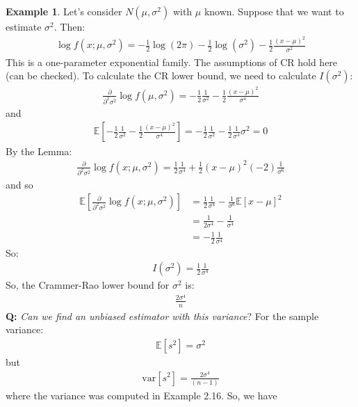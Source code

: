 \documentclass[11pt]{scrartcl}
\theoremstyle{definition}
\newtheorem{ex}{Example}
\theoremstyle{remark}
\newcommand{\EX}[1]{\mathbb{E}\left[#1 \right]}
\begin{document}
{\begin{ex} 
	Let's consider $N(\mu, \sigma^2)$ with $\mu$ known. Suppose that we want to estimate $\sigma^2$. Then: 
	\begin{align*}
		\log f(x; \mu, \sigma^2) = - \frac{1}{2}	 \log (2 \pi) - \frac{1}{2} \log (\sigma^2) - \frac{1}{2} \frac{(x-\mu)^2}{\sigma^2}
	\end{align*}
	This is a one-parameter exponential family. The assumptions of CR hold here (can be checked). To calculate the CR lower bound, we need to calculate $I(\sigma^2)$: 
	\begin{align*}
			\frac{\partial}{\partial^2 \sigma^2} \log f(\mu, \sigma^2) = - \frac{1}{2} \frac{1}{\sigma^2} - \frac{1}{2} \frac{(x-\mu)^2}{\sigma^4}
	\end{align*}
	and
	\begin{align*}
		\EX{- \frac{1}{2} \frac{1}{\sigma^2} - \frac{1}{2} \frac{(x-\mu)^2}{\sigma^4}} = -\frac{1}{2} \frac{1}{\sigma^2} - \frac{1}{2} \frac{1}{\sigma^4} \sigma^2 = 0 
	\end{align*}
	By the Lemma: 
	\begin{align*}
		\frac{\partial}{\partial^2 \sigma^2}	 \log f(x; \mu, \sigma^2) = \frac{1}{2} \frac{1}{\sigma^4} + \frac{1}{2} (x-\mu)^2(-2)\frac{1}{\sigma^6}	
	\end{align*}
	and so
	\begin{align*}
		\EX{\frac{\partial}{\partial^2 \sigma^2}	 \log f(x; \mu, \sigma^2)} & = \frac{1}{2} \frac{1}{\sigma^4} - \frac{1}{\sigma^6} \EX{x-\mu}^2 \\
			& = \frac{1}{2 \sigma^4} - \frac{1}{\sigma^4} \\
			& = -\frac{1}{2}\frac{1}{\sigma^4}
	\end{align*}
	So: 
	\begin{align*}
		I(\sigma^2) = \frac{1}{2} \frac{1}{\sigma^4}
	\end{align*}
	So, the Crammer-Rao lower bound  for $\sigma^2$ is: 
	\begin{align*}
		\frac{2 \sigma^4}{n}
	\end{align*}
	\textbf{Q:} \emph{Can we find an unbiased estimator with this variance}? For the sample variance: 
	\begin{align*}
		\EX{s^2} = \sigma^2 	
	\end{align*}
	but
	\begin{align*}
		\text{var}[s^2] = \frac{2 \sigma^4}{(n-1)}
	\end{align*}
	where the variance was computed in Example 2.16. So, we have
	\begin{align*}

\end{align*}
\end{ex}}
\end{document}
